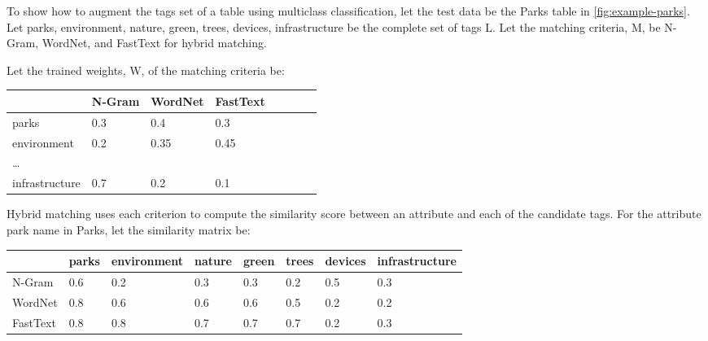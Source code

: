 To show how to augment the tags set of a table using multiclass classification, let the test data be the Parks table in \autoref{fig:example-parks}. Let {parks, environment, nature, green, trees, devices, infrastructure} be the complete set of tags L. Let the matching criteria, M, be {N-Gram, WordNet, and FastText} for hybrid matching.

Let the trained weights, W, of the matching criteria be:

\begin{table}[h!]
    \begin{center}
      \begin{tabular}{|l|l|l|l|l|l|l|l|}
        \hline        
        & \textbf{N-Gram} & \textbf{WordNet} & \textbf{FastText}\\
        \hline
        parks & 0.3 & 0.4 & 0.3 \\
        \hline
        environment & 0.2 & 0.35 & 0.45 \\
        \hline
        \dots &  &  &  \\
        \hline
        infrastructure & 0.7 & 0.2 & 0.1 \\
        \hline    
      \end{tabular}
    \end{center}
\end{table}

Hybrid matching uses each criterion to compute the similarity score between an attribute and each of the candidate tags. For the attribute park name in Parks, let the similarity matrix be:

\begin{table}[h!]
    \begin{center}
      \begin{tabular}{|l|l|l|l|l|l|l|l|}
        \hline
        & \textbf{parks} & \textbf{environment} & \textbf{nature} & \textbf{green} & \textbf{trees} & \textbf{devices} & \textbf{infrastructure}\\
        \hline
        N-Gram & 0.6 & 0.2 & 0.3 & 0.3 & 0.2 & 0.5 & 0.3 \\
        \hline
        WordNet & 0.8 & 0.6 & 0.6 & 0.6 & 0.5 & 0.2 & 0.2 \\
        \hline
        FastText & 0.8 & 0.8 & 0.7 & 0.7 & 0.7 & 0.2 & 0.3 \\
        \hline    
      \end{tabular}
    \end{center}
\end{table}

